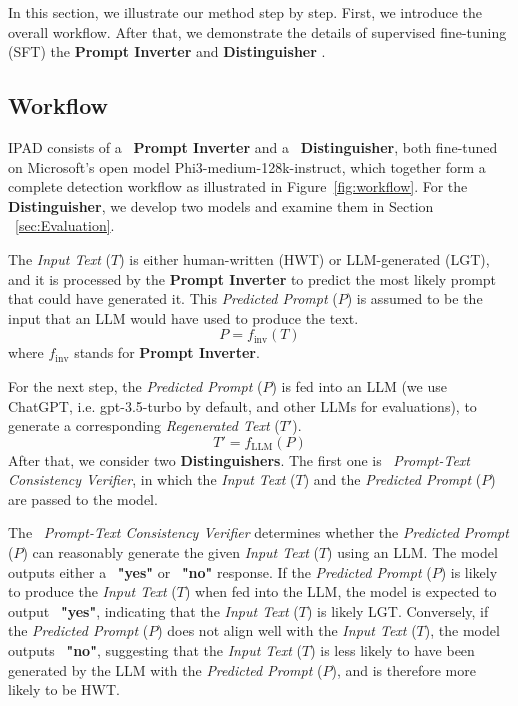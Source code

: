 In this section, we illustrate our method step by step. First, we introduce the overall workflow. After that, we demonstrate the details of supervised fine-tuning (SFT) the \textbf{Prompt Inverter} and \textbf{Distinguisher}
.

\subsection{Workflow}
IPAD consists of a ~\textbf{Prompt Inverter} and a ~\textbf{Distinguisher}, both fine-tuned on Microsoft's open model Phi3-medium-128k-instruct, which together form a complete detection workflow as illustrated in Figure~\ref{fig:workflow}. For the \textbf{Distinguisher}, we develop two models and examine them in Section ~\ref{sec:Evaluation}.


The \textit{Input Text} (\( T \)) is either human-written (HWT) or LLM-generated (LGT), and it is processed by the \textbf{Prompt Inverter} to predict the most likely prompt that could have generated it. This \textit{Predicted Prompt} (\( P \)) is assumed to be the input that an LLM would have used to produce the text. \[P = f_{\text{inv}}(T)\]  where \( f_{\text{inv}} \) stands for \textbf{Prompt Inverter}.

For the next step, the \textit{Predicted Prompt} (\( P \)) is fed into an LLM (we use ChatGPT, i.e. gpt-3.5-turbo by default, and other LLMs for evaluations), to generate a corresponding \textit{Regenerated Text} (\( T' \)). 
\[
T' = f_{\text{LLM}}(P)
\]  
After that, we consider two \textbf{Distinguishers}. The first one is ~\textit{Prompt-Text Consistency Verifier}, in which the \textit{Input Text} (\( T \)) and the \textit{Predicted Prompt} (\( P \)) are passed to the model.

The ~\textit{Prompt-Text Consistency Verifier} determines whether the \textit{Predicted Prompt} (\( P \)) can reasonably generate the given \textit{Input Text} (\( T \)) using an LLM. The model outputs either a ~\textbf{"yes"} or ~\textbf{"no"} response. If the \textit{Predicted Prompt} (\( P \)) is likely to produce the \textit{Input Text} (\( T \)) when fed into the LLM, the model is expected to output ~\textbf{"yes"}, indicating that the \textit{Input Text} (\( T \)) is likely LGT. Conversely, if the  \textit{Predicted Prompt} (\( P \)) does not align well with the \textit{Input Text} (\( T \)), the model outputs ~\textbf{"no"}, suggesting that the \textit{Input Text} (\( T \)) is less likely to have been generated by the LLM with the \textit{Predicted Prompt} (\( P \)), and is therefore more likely to be HWT.

